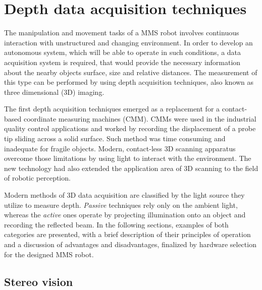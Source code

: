 \chapter{Depth data acquisition techniques}
\label{cha:acquisition}

The manipulation and movement tasks of a MMS robot involves continuous interaction with unstructured and changing environment. In order to develop an autonomous system, which will be able to operate in such conditions, a data acquisition system is required, that would provide the necessary information about the nearby objects surface, size and relative distances. The measurement of this type can be performed by using depth acquisition techniques, also known as three dimensional (3D) imaging.

The first depth acquisition techniques emerged as a replacement for a contact-based coordinate measuring machines (CMM). CMMs were used in the industrial quality control applications and worked by recording the displacement of a probe tip sliding across a solid surface. Such method was time consuming and inadequate for fragile objects. Modern, contact-less 3D scanning apparatus overcome those limitations by using light to interact with the environment. The new technology had also extended the application area of 3D scanning to the field of robotic perception.

Modern methods of 3D data acquisition are classified by the light source they utilize to measure depth. \textit{Passive} techniques rely only on the ambient light, whereas the \textit{active} ones operate by projecting illumination onto an object and recording the reflected beam. In the following sections, examples of both categories are presented, with a brief description of their principles of operation and a discussion of advantages and disadvantages, finalized by hardware selection for the designed MMS robot.


\section{Stereo vision}
\label{sec:stereo}

